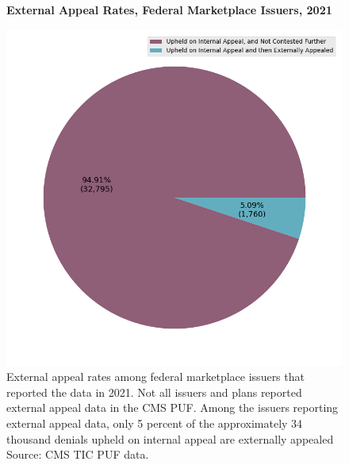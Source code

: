 \documentclass[psamsfonts]{amsart}
\theoremstyle{plain}
\theoremstyle{definition}
\theoremstyle{remark}
\begin{document}
\begin{figure}
	\centering
	\textbf{External Appeal Rates, Federal Marketplace Issuers, 2021}\par\medskip
	\includegraphics[width=0.85\columnwidth]{images/cms_puf/external_appeal_rates_all_insurers.png}
	\caption{External appeal rates among federal marketplace issuers that reported the data in 2021. Not all issuers and plans reported external appeal data in the CMS PUF. Among the issuers reporting external appeal data, only 5 percent of the approximately 34 thousand denials upheld on internal appeal are externally appealed Source: CMS TIC PUF data.}
	\label{federal_external_appeal_rates}
\end{figure}
\end{document}
